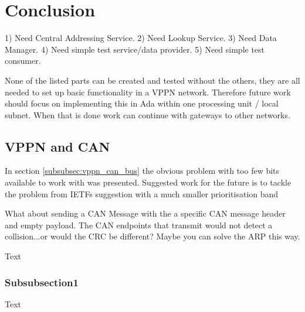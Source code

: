 \section{Conclusion}\label{sec:conclusion}
1) Need Central Addressing Service.
2) Need Lookup Service.
3) Need Data Manager.
4) Need simple test service/data provider.
5) Need simple test consumer.

None of the listed parts can be created and tested without the others, they are
all needed to set up basic functionality in a VPPN network. Therefore future
work should focus on implementing this in Ada within one processing unit /
local subnet. When that is done work can continue with gateways to other
networks.



\subsection{VPPN and CAN}
In section \ref{subsubsec:vppn_can_bus} the obvious problem with too few bits
available to work with was presented. Suggested work for the future is to
tackle the problem from IETFs suggestion \cite{web:draft-ip_over_can} with a much smaller prioritisation
band

What about sending a CAN Message with the a specific CAN message header and
empty payload. The CAN endpoints that transmit would not detect a
collision...or would the CRC be different? Maybe you can solve the ARP this
way.

Text
\subsubsection{Subsubsection1}
Text
